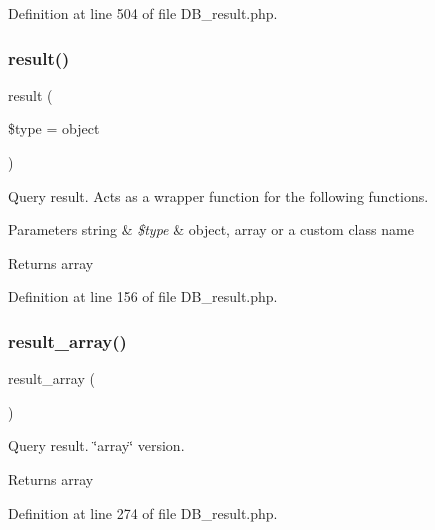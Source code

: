 Definition at line 504 of file D\+B\+\_\+result.\+php.

\mbox{\label{class_c_i___d_b__result_a86bc3a5f1694241cf86a6fd754553884}} 
\subsubsection{\texorpdfstring{result()}{result()}}
{\footnotesize\ttfamily result (\begin{DoxyParamCaption}\item[{}]{\$type = {\ttfamily \textquotesingle{}object\textquotesingle{}} }\end{DoxyParamCaption})}

Query result. Acts as a wrapper function for the following functions.


\begin{DoxyParams}[1]{Parameters}
string & {\em \$type} & \textquotesingle{}object\textquotesingle{}, \textquotesingle{}array\textquotesingle{} or a custom class name \\
\hline
\end{DoxyParams}
\begin{DoxyReturn}{Returns}
array 
\end{DoxyReturn}


Definition at line 156 of file D\+B\+\_\+result.\+php.

\mbox{\label{class_c_i___d_b__result_a444f7dd61bfbe3931a7188adad61feae}} 
\subsubsection{\texorpdfstring{result\_array()}{result\_array()}}
{\footnotesize\ttfamily result\+\_\+array (\begin{DoxyParamCaption}{ }\end{DoxyParamCaption})}

Query result. \char`\"{}array\char`\"{} version.

\begin{DoxyReturn}{Returns}
array 
\end{DoxyReturn}


Definition at line 274 of file D\+B\+\_\+result.\+php.

